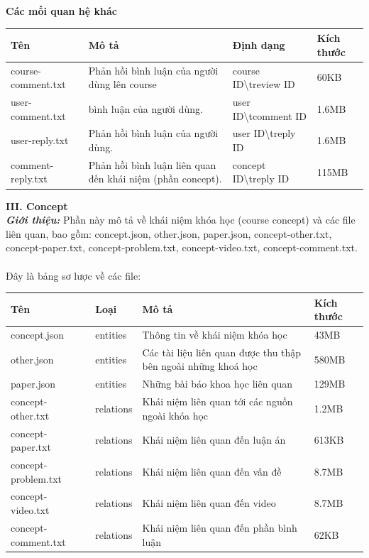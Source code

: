 %
\textbf{Các mối quan hệ khác}
\begin{center}
\begin{tabular}{|| m{5em}  m{10em}  m{11em}  m{5em}||} 
 \hline
 \textbf{Tên} & \textbf{Mô tả} & \textbf{Định dạng} & \textbf{Kích thước} \\ [0.5ex] 
 \hline\hline
course-comment.txt & Phản hồi bình luận của người dùng lên course & {course ID}\textbackslash t{review ID} &60KB \\
 \hline
 user-comment.txt &bình luận của người dùng. & {user ID}\textbackslash t{comment ID} & 1.6MB \\ \hline
 user-reply.txt & Phản hồi bình luận của người dùng.  & {user ID}\textbackslash t{reply ID} & 1.6MB \\ \hline
 comment-reply.txt& Phản hồi bình luận liên quan đến khái niệm (phần concept). & {concept ID}\textbackslash t{reply ID} &115MB  \\ [1ex] 
 \hline
\end{tabular}
\end{center}
%
\textbf{III. Concept}\\
\textbf{\textit{Giới thiệu:}} Phần này mô tả về khái niệm khóa học (course concept) và các file liên quan, bao gồm: concept.json, other.json, paper.json, concept-other.txt, concept-paper.txt, concept-problem.txt, concept-video.txt, concept-comment.txt.\\
\\
Đây là bảng sơ lược về các file:
%
\begin{center}
\begin{tabular}{|| m{5em}  m{5em}  m{18em}  m{6em}||} 
 \hline
 \textbf{Tên} & \textbf{Loại} & \textbf{Mô tả} & \textbf{Kích thước} \\ [0.5ex] 
 \hline\hline
 concept.json & entities & Thông tin về khái niệm khóa học & 43MB \\ 
 \hline
 other.json & entities & Các tài liệu liên quan được thu thập bên ngoài những khoá học & 580MB \\
 \hline
 paper.json & entities & Những bài báo khoa học liên quan & 129MB \\
 \hline
 concept-other.txt & relations & Khái niệm liên quan tới các nguồn ngoài khóa học & 1.2MB \\
 \hline
 concept-paper.txt & relations & Khái niệm liên quan đến luận án & 613KB \\
 \hline
 concept-problem.txt & relations & Khái niệm liên quan đến vấn đề & 8.7MB \\
 \hline
  concept-video.txt & relations & Khái niệm liên quan đến video & 8.7MB \\
 \hline
 concept-comment.txt & relations & Khái niệm liên quan đến phần bình luận & 62KB \\ [1ex] 
 \hline
\end{tabular}
\end{center}
